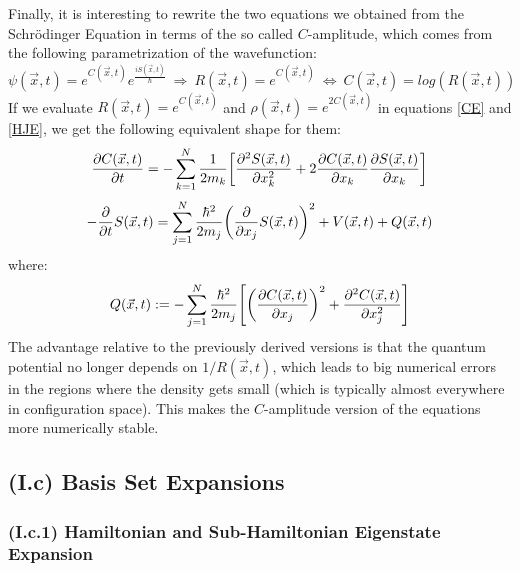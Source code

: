 \documentclass[11pt, a4paper]{article} %
\begin{document}
Finally, it is interesting to rewrite the two equations we obtained from the Schrödinger Equation in terms of the so called $C$-amplitude, which comes from the following parametrization of the wavefunction:
\begin{equation}
\psi(\vec{x},t)=e^{C(\vec{x},t)}e^{\frac{iS(\vec{x},t)}{\hbar}}\ \Longrightarrow\ R(\vec{x},t)=e^{C(\vec{x},t)} \ \Leftrightarrow \ C(\vec{x},t)=log(R(\vec{x},t))
\end{equation}
If we evaluate $R(\vec{x},t)=e^{C(\vec{x},t)}$ and $\rho(\vec{x},t)=e^{2C(\vec{x},t)}$ in equations \eqref{CE} and \eqref{HJE}, we get the following equivalent shape for them:
\begin{equation}\label{CE.C}
\pdv{C(\vec{x},t)}{t} = -\sum_{k=1}^N \frac{1}{2m_k}\qty[\pdv[2]{S(\vec{x},t)}{x_k}+2\pdv{C(\vec{x},t)}{x_k}\pdv{S(\vec{x},t)}{x_k}]
\end{equation}
\begin{equation}\label{HJE.C}
-\pdv{}{t}S(\vec{x},t) = \sum_{j=1}^N \frac{\hbar^2}{2m_j} \qty(\pdv{}{x_j} S(\vec{x},t) )^2+ V(\vec{x},t)+Q(\vec{x},t)
\end{equation}
where:
\begin{equation}\label{QP.C}
Q(\vec{x},t):=-\sum_{j=1}^N \frac{\hbar^2}{2m_j}\qty[\qty(\pdv{C(\vec{x},t)}{x_j})^2+\pdv[2]{C(\vec{x},t)}{x_j}]
\end{equation}
The advantage relative to the previously derived versions is that the quantum potential no longer depends on $1/R(\vec{x},t)$, which leads to big numerical errors in the regions where the density gets small (which is typically almost everywhere in configuration space). This makes the $C$-amplitude version of the equations more numerically stable.

\subsection*{(I.c) Basis Set Expansions}
\vspace{-0.4cm}
\subsubsection*{(I.c.1) Hamiltonian and Sub-Hamiltonian Eigenstate Expansion}
\vspace{-0.25cm}
\end{document}
